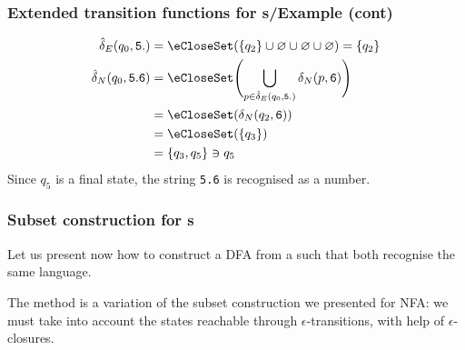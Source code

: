 % 
\begin{frame}[containsverbatim]
\frametitle{Extended transition functions for {\eNFA}s/Example (cont)}

\begin{align*}
   \hat{\delta}_E (q_0, \mathtt{5.})
&= \eCloseSet (\{q_2\} \cup \varnothing \cup \varnothing \cup
   \varnothing)
 = \{q_2\}\\
   \hat{\delta}_N (q_0, \mathtt{5.6})
&= \eCloseSet \Biggl( \bigcup_{p \in \hat{\delta}_E (q_0,
     \mathtt{5.})}{\delta_N (p, \mathtt{6})} \Biggr)\\
&= \eCloseSet (\delta_N (q_2, \mathtt{6}))\\
&= \eCloseSet (\{q_3\})\\
&= \{q_3, q_5\} \ni q_5
\end{align*}
Since \(q_5\) is a final state, the string \verb+5.6+ is recognised as
a number.

\end{frame}

% 
\begin{frame}
\frametitle{Subset construction for {\eNFA}s}

Let us present now how to construct a DFA from a \eNFA such that both
recognise the same language.

\bigskip

The method is a variation of the subset construction we presented for
NFA: we must take into account the states reachable through
\(\epsilon\)-transitions, with help of \(\epsilon\)-closures.

\end{frame}

